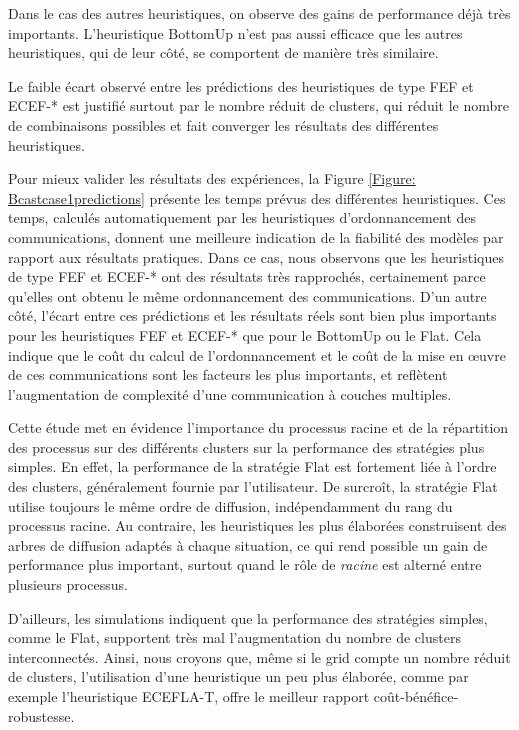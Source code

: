 Dans le cas des autres heuristiques, on observe des gains de performance
déjà très importants. L'heuristique BottomUp %
n'est pas aussi efficace que les autres heuristiques,
qui de leur côté, se comportent de manière très similaire.

Le faible écart observé entre les prédictions des heuristiques de
type FEF et ECEF-{*} est justifié surtout par le nombre réduit de
clusters, qui réduit le nombre de combinaisons possibles et fait converger
les résultats des différentes heuristiques. 

Pour mieux valider les résultats des expériences, la Figure \ref{Figure: Bcastcase1predictions}
présente les temps prévus des différentes heuristiques. Ces temps,
calculés automatiquement par les heuristiques d'ordonnancement des
communications, donnent une meilleure indication de la fiabilité des
modèles par rapport aux résultats pratiques. Dans ce cas, nous observons
que les heuristiques de type FEF et ECEF-{*} ont des résultats très
rapprochés, certainement parce qu'elles ont obtenu le même ordonnancement
des communications. D'un autre côté, l'écart entre ces prédictions
et les résultats réels sont bien plus importants pour les heuristiques
FEF et ECEF-{*} que pour le BottomUp ou le Flat. Cela indique que
le coût du calcul de l'ordonnancement et le coût de la mise en {\oe}uvre
de ces communications sont les facteurs les plus importants, et reflètent
l'augmentation de complexité d'une communication à couches multiples.

Cette étude met en évidence l'importance
du processus racine et de la répartition des processus sur des différents
clusters sur la performance des stratégies plus simples. En effet,
la performance de la stratégie Flat est fortement liée à l'ordre des clusters, généralement fournie par l'utilisateur.
De surcroît, la stratégie Flat utilise toujours le même ordre de diffusion,
indépendamment du rang du processus racine. Au contraire, les heuristiques
les plus élaborées construisent des arbres de diffusion adaptés à
chaque situation, ce qui rend possible un gain de performance plus
important, surtout quand le rôle de \emph{racine} est alterné entre
plusieurs processus.

D'ailleurs, les simulations indiquent que la performance des stratégies
simples, comme le Flat, supportent très mal l'augmentation du nombre
de clusters interconnectés.  Ainsi, nous croyons que, même si
le grid compte un nombre réduit de clusters, l'utilisation d'une
heuristique un peu plus élaborée, comme par exemple l'heuristique
ECEFLA-T, offre le meilleur rapport coût-bénéfice-robustesse.


